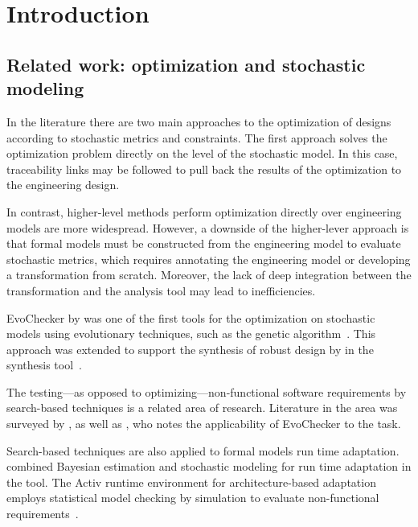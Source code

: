 \chapter{Introduction}
\label{chap:intro}


\section{Related work: optimization and stochastic modeling}
\label{sec:intro:relwork}

In the literature there are two main approaches to the optimization of designs according to stochastic metrics and constraints. The first approach solves the optimization problem directly on the level of the stochastic model. In this case, traceability links may be followed to pull back the results of the optimization to the engineering design.

In contrast, higher-level methods perform optimization directly over engineering models are more widespread. However, a downside of the higher-lever approach is that formal models must be constructed from the engineering model to evaluate stochastic metrics, which requires annotating the engineering model or developing a transformation from scratch. Moreover, the lack of deep integration between the transformation and the analysis tool may lead to inefficiencies.

EvoChecker by \citet{Gerasimou15evochecker} was one of the first tools for the optimization on stochastic models using evolutionary techniques, such as the  genetic algorithm~\citep{Deb02nsga}. This approach was extended to support the synthesis of robust design by \citet{Calinescu17robust} in the  synthesis tool~\citep{Calinescu17rodes}.

The testing---as opposed to optimizing---non-functional software requirements by search-based techniques is a related area of research. Literature in the area was surveyed by \citet{Afzal09testing}, as well as \citet{Parasa16testing}, who notes the applicability of EvoChecker to the task.

Search-based techniques are also applied to formal models run time adaptation. \citet{Epifani09adaptation} combined Bayesian estimation and stochastic modeling for run time adaptation in the  tool. The Activ runtime environment for architecture-based adaptation employs statistical model checking by simulation to evaluate non-functional requirements~\citep{Iftikhar17activforms}.

